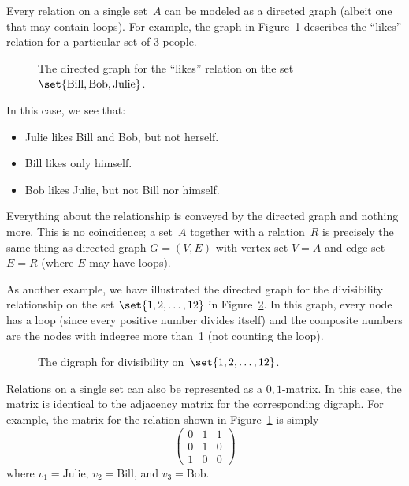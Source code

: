 Every relation on a single set~$A$ can be modeled as a directed graph
(albeit one that may contain loops).  For example, the graph in
Figure~\ref{fig:7FE} describes the ``likes'' relation for a particular
set of 3 people.

\begin{figure}



\caption{The directed graph for the ``likes'' relation on the set
  $\set{ \text{Bill}, \text{Bob}, \text{Julie} }$.}

\label{fig:7FE}

\end{figure}

In this case, we see that:
\begin{itemize}

\item
Julie likes Bill and Bob, but not herself.

\item
Bill likes only himself.

\item
Bob likes Julie, but not Bill nor himself.

\end{itemize}
Everything about the relationship is conveyed by the directed graph
and nothing more.  This is no coincidence; a set~$A$ together with a
relation~$R$ is precisely the same thing as directed graph $G = (V,
E)$ with vertex set $V = A$ and edge set $E = R$ (where $E$ may have
loops).

As another example, we have illustrated the directed graph for the
divisibility relationship on the set $\set{1, 2, \dots, 12}$ in
Figure~\ref{fig:7FF}.  In this graph, every node has a loop (since
every positive number divides itself) and the composite numbers are
the nodes with indegree more than~1 (not counting the
loop).

\begin{figure}



\caption{The digraph for divisibility on~$\set{1, 2, \dots, 12}$.}

\label{fig:7FF}

\end{figure}

Relations on a single set can also be represented as a $0, 1$-matrix.
In this case, the matrix is identical to the adjacency matrix for the
corresponding digraph.  For example, the matrix for the relation shown
in Figure~\ref{fig:7FE} is simply
\begin{equation*}
    \begin{pmatrix}
        0 & 1 & 1 \\
        0 & 1 & 0 \\
        1 & 0 & 0
    \end{pmatrix}
\end{equation*}
where $v_1 = \text{Julie}$, $v_2 = \text{Bill}$, and $v_3 =
\text{Bob}$.

